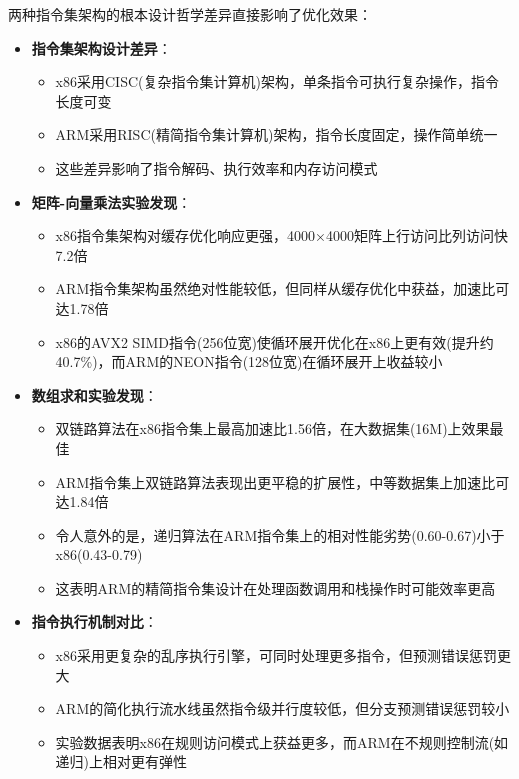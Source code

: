 \documentclass[a4paper,colorlinks=true,linkcolor=blue,urlcolor=blue,citecolor=green,bookmarks=true]{article}
\begin{document}
两种指令集架构的根本设计哲学差异直接影响了优化效果：

\begin{itemize}
  \item \textbf{指令集架构设计差异}：
  \begin{itemize}
    \item x86采用CISC(复杂指令集计算机)架构，单条指令可执行复杂操作，指令长度可变
    \item ARM采用RISC(精简指令集计算机)架构，指令长度固定，操作简单统一
    \item 这些差异影响了指令解码、执行效率和内存访问模式
  \end{itemize}
  
  \item \textbf{矩阵-向量乘法实验发现}：
  \begin{itemize}
    \item x86指令集架构对缓存优化响应更强，4000×4000矩阵上行访问比列访问快7.2倍
    \item ARM指令集架构虽然绝对性能较低，但同样从缓存优化中获益，加速比可达1.78倍
    \item x86的AVX2 SIMD指令(256位宽)使循环展开优化在x86上更有效(提升约40.7\%)，而ARM的NEON指令(128位宽)在循环展开上收益较小
  \end{itemize}
  
  \item \textbf{数组求和实验发现}：
  \begin{itemize}
    \item 双链路算法在x86指令集上最高加速比1.56倍，在大数据集(16M)上效果最佳
    \item ARM指令集上双链路算法表现出更平稳的扩展性，中等数据集上加速比可达1.84倍
    \item 令人意外的是，递归算法在ARM指令集上的相对性能劣势(0.60-0.67)小于x86(0.43-0.79)
    \item 这表明ARM的精简指令集设计在处理函数调用和栈操作时可能效率更高
  \end{itemize}
  
  \item \textbf{指令执行机制对比}：
  \begin{itemize}
    \item x86采用更复杂的乱序执行引擎，可同时处理更多指令，但预测错误惩罚更大
    \item ARM的简化执行流水线虽然指令级并行度较低，但分支预测错误惩罚较小
    \item 实验数据表明x86在规则访问模式上获益更多，而ARM在不规则控制流(如递归)上相对更有弹性
  \end{itemize}
\end{itemize}
\end{document}
